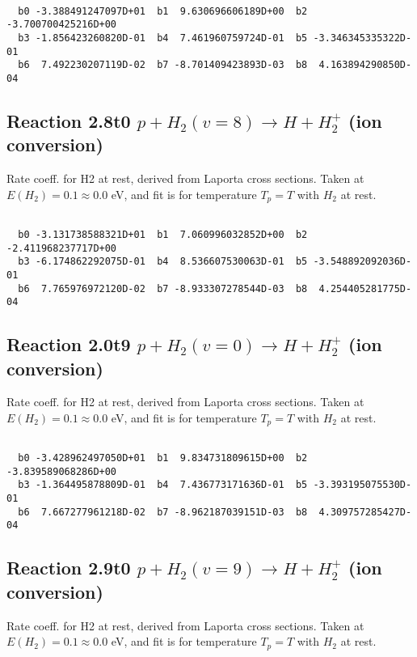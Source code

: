 \begin{small}\begin{verbatim}

  b0 -3.388491247097D+01  b1  9.630696606189D+00  b2 -3.700700425216D+00
  b3 -1.856423260820D-01  b4  7.461960759724D-01  b5 -3.346345335322D-01
  b6  7.492230207119D-02  b7 -8.701409423893D-03  b8  4.163894290850D-04

\end{verbatim}\end{small}

\newpage
\subsection{
Reaction 2.8t0
$ p + H_2(v=8) \rightarrow H + H_2^+$ (ion conversion)
}
Rate coeff. for H2 at rest, derived from Laporta cross sections.
Taken at $E(H_2) = 0.1 \approx 0.0$ eV,  and fit is for temperature $T_p=T$ with $H_2$ at rest.

\begin{small}\begin{verbatim}

  b0 -3.131738588321D+01  b1  7.060996032852D+00  b2 -2.411968237717D+00
  b3 -6.174862292075D-01  b4  8.536607530063D-01  b5 -3.548892092036D-01
  b6  7.765976972120D-02  b7 -8.933307278544D-03  b8  4.254405281775D-04

\end{verbatim}\end{small}

\newpage
\subsection{
Reaction 2.0t9
$ p + H_2(v=0) \rightarrow H + H_2^+$ (ion conversion)
}
Rate coeff. for H2 at rest, derived from Laporta cross sections.
Taken at $E(H_2) = 0.1 \approx 0.0$ eV,  and fit is for temperature $T_p=T$ with $H_2$ at rest.

\begin{small}\begin{verbatim}

  b0 -3.428962497050D+01  b1  9.834731809615D+00  b2 -3.839589068286D+00
  b3 -1.364495878809D-01  b4  7.436773171636D-01  b5 -3.393195075530D-01
  b6  7.667277961218D-02  b7 -8.962187039151D-03  b8  4.309757285427D-04

\end{verbatim}\end{small}

\newpage
\subsection{
Reaction 2.9t0
$ p + H_2(v=9) \rightarrow H + H_2^+$ (ion conversion)
}
Rate coeff. for H2 at rest, derived from Laporta cross sections.
Taken at $E(H_2) = 0.1 \approx 0.0$ eV,  and fit is for temperature $T_p=T$ with $H_2$ at rest.

